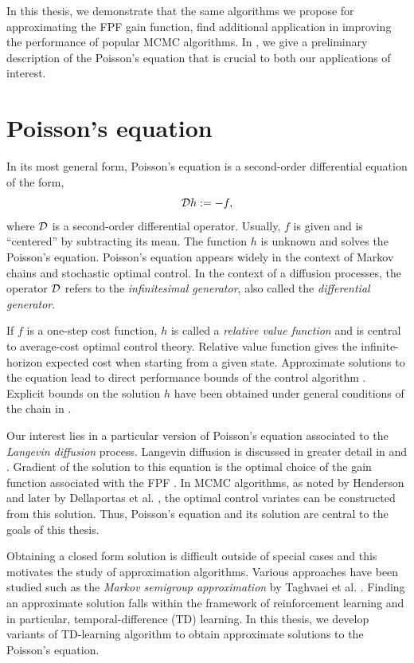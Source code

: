 In this thesis, we demonstrate that the same algorithms we propose for approximating the FPF gain function, find additional application in improving the performance of popular MCMC algorithms. In , we give a preliminary description of the Poisson's equation that is crucial to both our applications of interest.

\section{Poisson's equation} 
\label{poissons_eq}
In its most general form, Poisson's equation is a second-order differential equation of the form,
\begin{equation*}
{\cal D} h := - f,
\end{equation*}
where ${\cal D}$ is a second-order differential operator. Usually, $f$ is given and is ``centered'' by subtracting its mean. The function $h$ is unknown and solves the Poisson's equation. Poisson's equation appears widely in the context of Markov chains and stochastic optimal control. In the context of a diffusion processes, the operator ${\cal D}$ refers to the \textit{infinitesimal generator}, also called the \textit{differential generator}. 

If $f$ is a one-step cost function, $h$ is called a \textit{relative value function} and is central to average-cost optimal control theory.  Relative value function gives the infinite-horizon expected cost when starting from a given state. Approximate solutions to the equation lead to direct performance bounds of the control algorithm \cite{ctcn}. Explicit bounds on the solution $h$ have been obtained under general conditions of the chain in \cite{}.

Our interest lies in a particular version of Poisson's equation associated to the \textit{Langevin diffusion} process. Langevin diffusion is discussed in greater detail in  and . Gradient of the solution to this equation is the optimal choice of the gain function associated with the FPF \cite{yanmehmey13}. In MCMC algorithms, as noted by Henderson \cite{henthesis97} and later by Dellaportas et al. \cite{delkon12}, the optimal control variates can be constructed from this solution. Thus, Poisson's equation and its solution are central to the goals of this thesis. 

Obtaining a closed form solution is difficult outside of special cases and this motivates the study of approximation algorithms. Various approaches have been studied such as the \textit{Markov semigroup approximation} by Taghvaei et al. \cite{tagmeh16a}. Finding an approximate solution falls within the framework of reinforcement learning and in particular, temporal-difference (TD) learning. In this thesis, we develop variants of TD-learning algorithm to obtain approximate solutions to the Poisson's equation.


